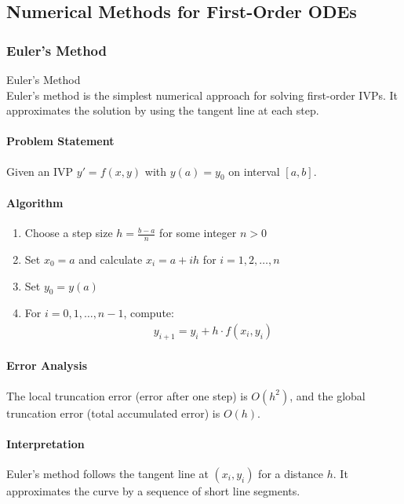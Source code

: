\subsection{Numerical Methods for First-Order ODEs}

\subsubsection{Euler's Method}

\begin{KR}{Euler's Method}\\
Euler's method is the simplest numerical approach for solving first-order IVPs. It approximates the solution by using the tangent line at each step.

\paragraph{Problem Statement}
Given an IVP $y' = f(x,y)$ with $y(a) = y_0$ on interval $[a,b]$.

\paragraph{Algorithm}
\begin{enumerate}
    \item Choose a step size $h = \frac{b-a}{n}$ for some integer $n > 0$
    \item Set $x_0 = a$ and calculate $x_i = a + ih$ for $i = 1, 2, \ldots, n$
    \item Set $y_0 = y(a)$
    \item For $i = 0, 1, \ldots, n-1$, compute:
    \begin{align*}
    y_{i+1} = y_i + h \cdot f(x_i, y_i)
    \end{align*}
\end{enumerate}

\paragraph{Error Analysis}
The local truncation error (error after one step) is $O(h^2)$, and the global truncation error (total accumulated error) is $O(h)$.

\paragraph{Interpretation}
Euler's method follows the tangent line at $(x_i, y_i)$ for a distance $h$. It approximates the curve by a sequence of short line segments.
\end{KR}

